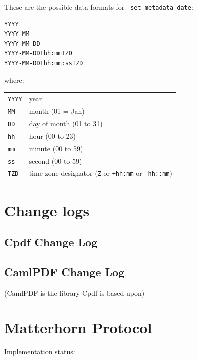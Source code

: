 \documentclass{book}
\begin{document}
These are the possible data formats for \texttt{-set-metadata-date}:

\begin{verbatim}
YYYY
YYYY-MM
YYYY-MM-DD
YYYY-MM-DDThh:mmTZD
YYYY-MM-DDThh:mm:ssTZD
\end{verbatim}

\noindent where:

\medskip
\begin{tabular}{ll}
\texttt{YYYY} & year \\
\texttt{MM} & month (01 = Jan)\\
\texttt{DD} & day of month (01 to 31)\\
\texttt{hh} & hour (00 to 23)\\
\texttt{mm} & minute (00 to 59)\\
\texttt{ss} & second (00 to 59)\\
\texttt{TZD} & time zone designator (\texttt{Z} or \texttt{+hh:mm} or \texttt{-hh::mm})
\end{tabular}
\pagestyle{fancy}

\vfill
\chapter{Change logs}\pagestyle{empty}

\section{Cpdf Change Log}
{\footnotesize\begin{alltt}

\end{alltt}}

\section{CamlPDF Change Log}
(CamlPDF is the library Cpdf is based upon)

{\footnotesize\begin{alltt}

\end{alltt}}

\chapter{Matterhorn Protocol}\pagestyle{empty}

Implementation status:
\end{document}
